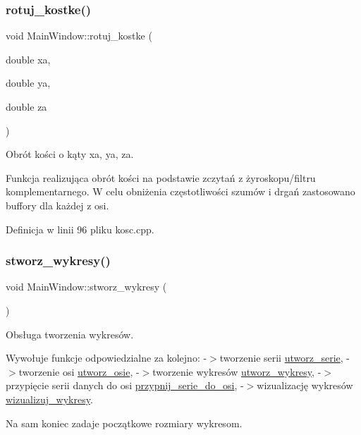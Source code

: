 \subsubsection{\texorpdfstring{rotuj\+\_\+kostke()}{rotuj\_kostke()}}
{\footnotesize\ttfamily void Main\+Window\+::rotuj\+\_\+kostke (\begin{DoxyParamCaption}\item[{double}]{xa,  }\item[{double}]{ya,  }\item[{double}]{za }\end{DoxyParamCaption})}



Obrót kości o kąty xa, ya, za. 

Funkcja realizująca obrót kości na podstawie zczytań z żyroskopu/filtru komplementarnego. W celu obniżenia częstotliwości szumów i drgań zastosowano buffory dla każdej z osi. 

Definicja w linii 96 pliku kosc.\+cpp.

\mbox{\label{class_main_window_a0669fa55d3cd37cef0e9e3d6e296ebd2}} 
\subsubsection{\texorpdfstring{stworz\+\_\+wykresy()}{stworz\_wykresy()}}
{\footnotesize\ttfamily void Main\+Window\+::stworz\+\_\+wykresy (\begin{DoxyParamCaption}{ }\end{DoxyParamCaption})}



Obsługa tworzenia wykresów. 

Wywołuje funkcje odpowiedzialne za kolejno\+: -\/$>$tworzenie serii \hyperlink{class_main_window_a7c108455f05b3e2532088b38870e2ca2}{utworz\+\_\+serie}, -\/$>$tworzenie osi \hyperlink{class_main_window_a94be5a5d63c0b8f071923a32f0215198}{utworz\+\_\+osie}, -\/$>$tworzenie wykresów \hyperlink{class_main_window_a01486cea6f70518576b42f372c7fbf7a}{utworz\+\_\+wykresy}, -\/$>$przypięcie serii danych do osi \hyperlink{class_main_window_a07cf16cd47bfdef75cebcfc3e2e02c4d}{przypnij\+\_\+serie\+\_\+do\+\_\+osi}, -\/$>$wizualizację wykresów \hyperlink{class_main_window_a1efac5efcb844bf7db47b844f7c6d87e}{wizualizuj\+\_\+wykresy}.

Na sam koniec zadaje początkowe rozmiary wykresom. 

